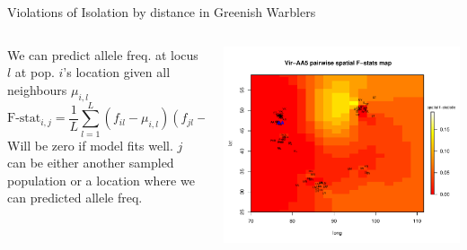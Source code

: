 \documentclass{beamer}
\begin{document}
\begin{frame}{Violations of Isolation by distance in Greenish Warblers}

\begin{columns}
\begin{column}{0.4\textwidth}
We can predict allele freq. at locus $l$ at pop. $i$'s location given all neighbours $\mu_{i,l}$
\begin{equation*}
\textrm{F-stat}_{i,j}  = \frac{1}{L} \sum_{l=1}^L  (f_{il} - \mu_{i,l} )(f_{jl}-\epsilon_l)
\end{equation*}
Will be zero if model fits well. $j$ can be either another sampled
population or a location where we can predicted allele freq.
\end{column}
\begin{column}{0.6\textwidth}
\pause 

	\begin{center} \includegraphics[width=  0.9 \textwidth]{../smbe_spacemix_figs/fstat_map_Vir-AA5}
 \end{center}
\end{column}
\end{columns}
\end{frame}
\end{document}
